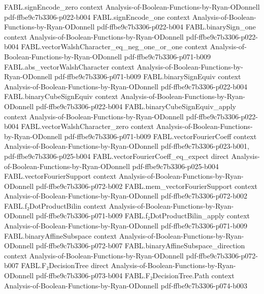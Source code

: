 \begin{theorem}
  {FABL.signEncode_zero}
  {context}
  {Analysis-of-Boolean-Functions-by-Ryan-ODonnell}
  {pdf-ffbe9c7b3306-p022-b004}
\proofstep
  {FABL.signEncode_one}
  {context}
  {Analysis-of-Boolean-Functions-by-Ryan-ODonnell}
  {pdf-ffbe9c7b3306-p022-b004}
\proofstep
  {FABL.binarySign_one}
  {context}
  {Analysis-of-Boolean-Functions-by-Ryan-ODonnell}
  {pdf-ffbe9c7b3306-p022-b004}
\proofstep
  {FABL.vectorWalshCharacter_eq_neg_one_or_one}
  {context}
  {Analysis-of-Boolean-Functions-by-Ryan-ODonnell}
  {pdf-ffbe9c7b3306-p071-b009}
\proofstep
  {FABL.abs_vectorWalshCharacter}
  {context}
  {Analysis-of-Boolean-Functions-by-Ryan-ODonnell}
  {pdf-ffbe9c7b3306-p071-b009}
\proofstep
  {FABL.binarySignEquiv}
  {context}
  {Analysis-of-Boolean-Functions-by-Ryan-ODonnell}
  {pdf-ffbe9c7b3306-p022-b004}
\proofstep
  {FABL.binaryCubeSignEquiv}
  {context}
  {Analysis-of-Boolean-Functions-by-Ryan-ODonnell}
  {pdf-ffbe9c7b3306-p022-b004}
\proofstep
  {FABL.binaryCubeSignEquiv_apply}
  {context}
  {Analysis-of-Boolean-Functions-by-Ryan-ODonnell}
  {pdf-ffbe9c7b3306-p022-b004}
\proofstep
  {FABL.vectorWalshCharacter_zero}
  {context}
  {Analysis-of-Boolean-Functions-by-Ryan-ODonnell}
  {pdf-ffbe9c7b3306-p071-b009}
\proofstep
  {FABL.vectorFourierCoeff}
  {context}
  {Analysis-of-Boolean-Functions-by-Ryan-ODonnell}
  {pdf-ffbe9c7b3306-p023-b001,
    pdf-ffbe9c7b3306-p025-b004}
\proofstep
  {FABL.vectorFourierCoeff_eq_expect}
  {direct}
  {Analysis-of-Boolean-Functions-by-Ryan-ODonnell}
  {pdf-ffbe9c7b3306-p025-b004}
\proofstep
  {FABL.vectorFourierSupport}
  {context}
  {Analysis-of-Boolean-Functions-by-Ryan-ODonnell}
  {pdf-ffbe9c7b3306-p072-b002}
\proofstep
  {FABL.mem_vectorFourierSupport}
  {context}
  {Analysis-of-Boolean-Functions-by-Ryan-ODonnell}
  {pdf-ffbe9c7b3306-p072-b002}
\proofstep
  {FABL.f₂DotProductBilin}
  {context}
  {Analysis-of-Boolean-Functions-by-Ryan-ODonnell}
  {pdf-ffbe9c7b3306-p071-b009}
\proofstep
  {FABL.f₂DotProductBilin_apply}
  {context}
  {Analysis-of-Boolean-Functions-by-Ryan-ODonnell}
  {pdf-ffbe9c7b3306-p071-b009}
\proofstep
  {FABL.binaryAffineSubspace}
  {context}
  {Analysis-of-Boolean-Functions-by-Ryan-ODonnell}
  {pdf-ffbe9c7b3306-p072-b007}
\proofstep
  {FABL.binaryAffineSubspace_direction}
  {context}
  {Analysis-of-Boolean-Functions-by-Ryan-ODonnell}
  {pdf-ffbe9c7b3306-p072-b007}
\proofstep
  {FABL.F₂DecisionTree}
  {direct}
  {Analysis-of-Boolean-Functions-by-Ryan-ODonnell}
  {pdf-ffbe9c7b3306-p073-b004}
\proofstep
  {FABL.F₂DecisionTree.Path}
  {context}
  {Analysis-of-Boolean-Functions-by-Ryan-ODonnell}
  {pdf-ffbe9c7b3306-p074-b003}

\end{theorem}

